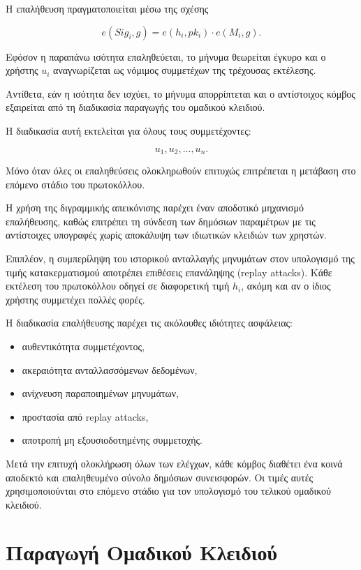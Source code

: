 \documentclass[12pt,a4paper]{report}
\begin{document}
Η επαλήθευση πραγματοποιείται μέσω της σχέσης

\[
e(Sig_i,g)
=
e(h_i,pk_i)\cdot e(M_i,g).
\]

Εφόσον η παραπάνω ισότητα επαληθεύεται, το μήνυμα θεωρείται έγκυρο και ο χρήστης $u_i$ αναγνωρίζεται ως νόμιμος συμμετέχων της τρέχουσας εκτέλεσης.

Αντίθετα, εάν η ισότητα δεν ισχύει, το μήνυμα απορρίπτεται και ο αντίστοιχος κόμβος εξαιρείται από τη διαδικασία παραγωγής του ομαδικού κλειδιού.

Η διαδικασία αυτή εκτελείται για όλους τους συμμετέχοντες:

\[
u_1,u_2,\ldots,u_n.
\]

Μόνο όταν όλες οι επαληθεύσεις ολοκληρωθούν επιτυχώς επιτρέπεται η μετάβαση στο επόμενο στάδιο του πρωτοκόλλου.

Η χρήση της διγραμμικής απεικόνισης παρέχει έναν αποδοτικό μηχανισμό επαλήθευσης, καθώς επιτρέπει τη σύνδεση των δημόσιων παραμέτρων με τις αντίστοιχες υπογραφές χωρίς αποκάλυψη των ιδιωτικών κλειδιών των χρηστών.

Επιπλέον, η συμπερίληψη του ιστορικού ανταλλαγής μηνυμάτων στον υπολογισμό της τιμής κατακερματισμού αποτρέπει επιθέσεις επανάληψης (replay attacks). Κάθε εκτέλεση του πρωτοκόλλου οδηγεί σε διαφορετική τιμή $h_i$, ακόμη και αν ο ίδιος χρήστης συμμετέχει πολλές φορές.

Η διαδικασία επαλήθευσης παρέχει τις ακόλουθες ιδιότητες ασφάλειας:

\begin{itemize}
\item αυθεντικότητα συμμετέχοντος,
\item ακεραιότητα ανταλλασσόμενων δεδομένων,
\item ανίχνευση παραποιημένων μηνυμάτων,
\item προστασία από replay attacks,
\item αποτροπή μη εξουσιοδοτημένης συμμετοχής.
\end{itemize}

Μετά την επιτυχή ολοκλήρωση όλων των ελέγχων, κάθε κόμβος διαθέτει ένα κοινά αποδεκτό και επαληθευμένο σύνολο δημόσιων συνεισφορών. Οι τιμές αυτές χρησιμοποιούνται στο επόμενο στάδιο για τον υπολογισμό του τελικού ομαδικού κλειδιού.

\section{Παραγωγή Ομαδικού Κλειδιού}
\end{document}
